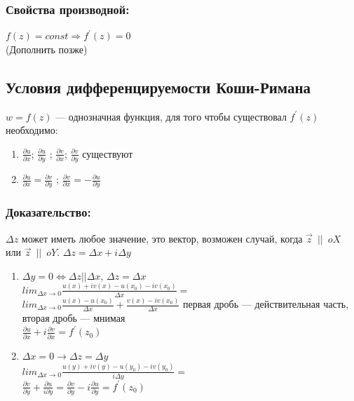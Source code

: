 \documentclass{article}
\begin{document}
            \subsubsection*{Свойства производной:}
            $f(z)=const \Rightarrow f^{\prime}(z)=0$\\
            (Дополнить позже)
            \newpage
            \subsection{Условия дифференцируемости Коши-Римана}
            \footnotemark {}
            $w=f(z)$ --- однозначная функция, для того чтобы существовал $f^{\prime}(z)$ необходимо:
            \begin{enumerate}
              \item $\frac{\partial u}{\partial x}$;  $\frac{\partial u}{\partial y}$ ;  $\frac{\partial v}{\partial x}$;  $\frac{\partial v}{\partial y}$  существуют
              \item $\frac{\partial u}{\partial x} = \frac{\partial v}{\partial y}$ ; $\frac{\partial v}{\partial x} = - \frac{\partial u}{\partial y}$
            \end{enumerate}
            \subsubsection*{Доказательство:}
            $\Delta z$ может иметь любое значение, это вектор, возможен случай, когда $\vec{z} \enspace || \enspace oX$ или $\vec{z} \enspace || \enspace oY$. $\Delta z = \Delta x + i \Delta y $
            \begin{enumerate}
              \item $\Delta y=0 \Leftrightarrow \Delta z || \Delta x$, $\Delta z = \Delta x$\\
              $lim_{\Delta x \rightarrow 0} \frac{u(x)+iv(x)-u(x_{0})-iv(x_{0})}{\Delta x}=$\\
            $lim_{\Delta x \rightarrow 0} \frac{u(x)-u(x_{0})}{\Delta x}+\frac{v(x)-iv(x_{0})}{\Delta x}$ первая дробь --- действительная часть, вторая дробь --- мнимая\\
            $\frac{\partial u}{\partial x} +i \frac{\partial v}{\partial x}=f^{\prime}(z_{0})$
            \item $\Delta x=0 \rightarrow \Delta z = \Delta y$\\
            $lim_{\Delta x \rightarrow 0} \frac{u(y)+iv(y)-u(y_{0})-iv(y_{0})}{i \Delta y}=$\\
            $\frac{\partial v}{\partial y} + \frac{\partial u}{i \partial y}=\frac{\partial v}{\partial y} - i \frac{\partial u}{\partial y}=f^{\prime}(z_{0})$
            \end{enumerate}
\end{document}
